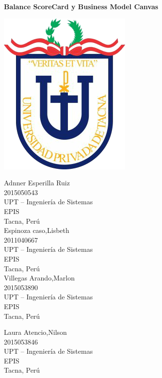 \documentclass[10pt,a4paper]{article}
\begin{document}
		
		\begin{center}
			\huge \textbf{Balance ScoreCard y Business Model Canvas} 
		\end{center}
		\vspace{\baselineskip}
		\begin{center}
			\includegraphics[scale=0.37]{./Imagenes/logo}
		\end{center}
		\vspace{\baselineskip}
		\begin{multicols}{2}
			\small
			\begin{center}
				Adnner Esperilla Ruiz\\
				2015050543\\
				UPT – Ingeniería de Sistemas\\
				EPIS\\
				Tacna, Perú\\
				\vspace{\baselineskip}
				Espinoza caso,Lisbeth\\
				2011040667\\
				UPT – Ingeniería de Sistemas\\  
				EPIS\\
				Tacna, Perú\\                 
				\vspace{\baselineskip}
				Villegas Arando,Marlon\\
				2015053890\\
				UPT – Ingeniería de Sistemas\\  
				EPIS\\	
				Tacna, Perú\\                 
				\columnbreak
				
				\vspace{\baselineskip}
				Laura Atencio,Nilson\\
				2015053846\\
				UPT – Ingeniería de Sistemas\\  
				EPIS\\	
				Tacna, Perú\\                 
        

			\end{center}
			\normalsize			
		\end{multicols}
		\vspace{\baselineskip}
	
\end{document}
